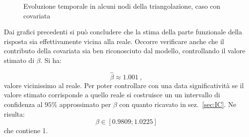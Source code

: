 \documentclass[a4paper,11pt,twoside,openright]{book}							%
\begin{document}
\begin{figure}[t]
	\centering
	\caption{Evoluzione temporale in alcuni nodi della triangolazione, caso con covariata}
	\label{fig:DomCcovar_ris2}
\end{figure}

Dai grafici precedenti si può concludere che la stima della parte funzionale della risposta sia effettivamente vicina alla reale. Occorre verificare anche che il contributo della covariata sia ben riconosciuto dal modello, controllando il valore stimato di $\beta$. Si ha:

$$
\hat{\beta} \approx 1.001 \ ,
$$
valore vicinissimo al reale. Per poter controllare con una data significatività se il valore stimato corrisponde a quello reale si costruisce un un intervallo di confidenza al $95\%$ approssimato per $\beta$ con quanto ricavato in sez.~\ref{sec:IC}. Ne risulta:
$$
\beta \in [0.9809;1.0225]
$$
che contiene 1. 
\end{document}
